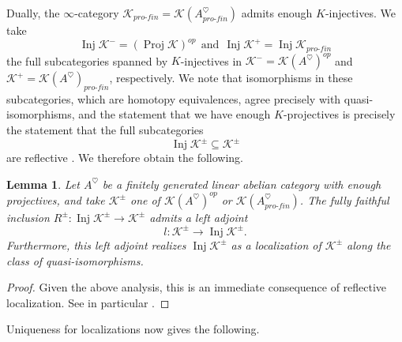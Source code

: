 \documentclass[reqno]{amsart}
\newtheorem{lemma}{Lemma}[section]
\theoremstyle{definition}
\newcommand{\msc}[1]{\mathscr{#1}}
\newcommand{\opn}[1]{\operatorname{#1}}
\newcommand{\pf}{pro\text{-}fin}
\renewcommand{\1}{\mathbf{1}}
\begin{document}
Dually, the $\infty$-category $\msc{K}_{\pf}=\msc{K}(A^{\heartsuit}_{\pf})$ admits enough $K$-injectives. We take
\[
\opn{Inj}\msc{K}^-=(\opn{Proj}\msc{K})^{op}\ \ \text{and}\ \ \opn{Inj}\msc{K}^+=\opn{Inj}\msc{K}_{\pf}
\]
the full subcategories spanned by $K$-injectives in $\msc{K}^{-}=\msc{K}(A^{\heartsuit})^{op}$ and $\msc{K}^+=\msc{K}(A^{\heartsuit})_{\pf}$, respectively.  We note that isomorphisms in these subcategories, which are homotopy equivalences, agree precisely with quasi-isomorphisms, and the statement that we have enough $K$-projectives is precisely the statement that the full subcategories
\[
\opn{Inj}\msc{K}^{\pm}\subseteq \msc{K}^{\pm}
\]
are reflective \cite[\href{https://kerodon.net/tag/02F5}{01F5}]{kerodon}.  We therefore obtain the following.

\begin{lemma}
Let $A^{\heartsuit}$ be a finitely generated linear abelian category with enough projectives, and take $\msc{K}^{\pm}$ one of $\msc{K}(A^{\heartsuit})^{op}$ or $\msc{K}(A^{\heartsuit}_{\pf})$.  The fully faithful inclusion $R^{\pm}:\opn{Inj}\msc{K}^{\pm}\to \msc{K}^{\pm}$ admits a left adjoint
\[
l:\msc{K}^{\pm}\to \opn{Inj}\msc{K}^{\pm}.
\]
Furthermore, this left adjoint realizes $\opn{Inj}\msc{K}^{\pm}$ as a localization of $\msc{K}^{\pm}$ along the class of quasi-isomorphisms.
\end{lemma}

\begin{proof}
Given the above analysis, this is an immediate consequence of reflective localization. See in particular \cite[\href{https://kerodon.net/tag/02FA}{02FA}, \href{https://kerodon.net/tag/02FE}{02FE}, \href{https://kerodon.net/tag/04JL}{04JL}]{kerodon}.
\end{proof}

Uniqueness for localizations now gives the following.
\end{document}
